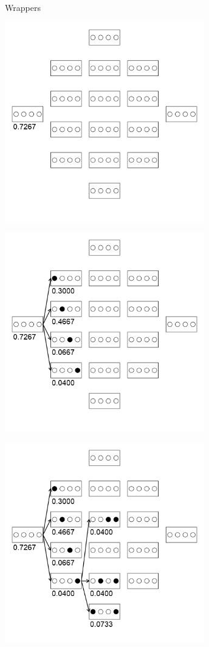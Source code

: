 \documentclass[11pt,compress,t,notes=noshow, xcolor=table]{beamer}
\begin{document}
\begin{vbframe}{Wrappers}
    \begin{center}
    \includegraphics[width = 0.65\textwidth]{figure_man/wrapperanim2.png}
    \end{center}

    \framebreak

    \begin{center}
    \includegraphics[width = 0.65\textwidth]{figure_man/wrapperanim3.png}
    \end{center}

    \framebreak

    \begin{center}
    \includegraphics[width = 0.65\textwidth]{figure_man/wrapperanim4.png}
    \end{center}


\end{vbframe}
\end{document}

